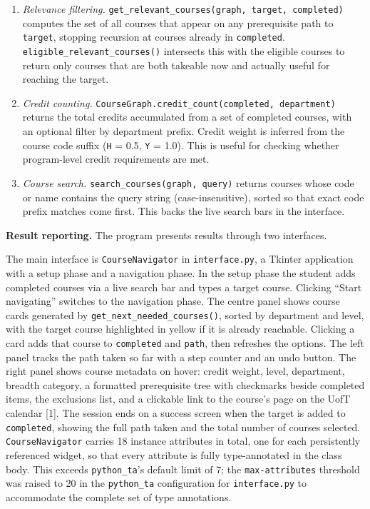 \documentclass[11pt]{article}
\begin{document}
\begin{enumerate}
    A \verb|visited| set is threaded through all recursive calls to prevent infinite loops
    when the prerequisite graph has cycles.

    \item \textit{Relevance filtering.}
    \verb|get_relevant_courses(graph, target, completed)| computes the set of all courses
    that appear on any prerequisite path to \verb|target|, stopping recursion at courses
    already in \verb|completed|. \verb|eligible_relevant_courses()| intersects this with the
    eligible courses to return only courses that are both takeable now and actually useful for
    reaching the target.

    \item \textit{Credit counting.}
    \verb|CourseGraph.credit_count(completed, department)| returns the total credits
    accumulated from a set of completed courses, with an optional filter by department prefix.
    Credit weight is inferred from the course code suffix (\verb|H| = 0.5, \verb|Y| = 1.0).
    This is useful for checking whether program-level credit requirements are met.

    \item \textit{Course search.}
    \verb|search_courses(graph, query)| returns courses whose code or name contains the query
    string (case-insensitive), sorted so that exact code prefix matches come first. This backs
    the live search bars in the interface.

\end{enumerate}

\textbf{Result reporting.} The program presents results through two interfaces.

The main interface is \verb|CourseNavigator| in \verb|interface.py|, a Tkinter application
with a setup phase and a navigation phase. In the setup phase the student adds completed
courses via a live search bar and types a target course. Clicking ``Start navigating''
switches to the navigation phase. The centre panel shows course cards generated by
\verb|get_next_needed_courses()|, sorted by department and level, with the target course
highlighted in yellow if it is already reachable. Clicking a card adds that course to
\verb|completed| and \verb|path|, then refreshes the options. The left panel tracks the path
taken so far with a step counter and an undo button. The right panel shows course metadata
on hover: credit weight, level, department, breadth category, a formatted prerequisite
tree with checkmarks beside completed items, the exclusions list, and a clickable link to the
course's page on the UofT calendar [1]. The session ends on a success screen when the target
is added to \verb|completed|, showing the full path taken and the total number of courses
selected. \verb|CourseNavigator| carries 18 instance attributes in total, one for each
persistently referenced widget, so that every attribute is fully type-annotated in the
class body. This exceeds \verb|python_ta|'s default limit of 7; the \verb|max-attributes|
threshold was raised to 20 in the \verb|python_ta| configuration for \verb|interface.py|
to accommodate the complete set of type annotations.
\end{document}
